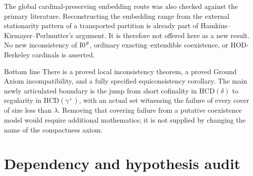 \documentclass[11pt,letterpaper]{article}
\theoremstyle{definition}
\newcommand{\Izero}{\mathrm{I0}}
\newcommand{\HCD}{\mathrm{HCD}}
\begin{document}
The global cardinal-preserving embedding route was also checked against the
primary literature. Reconstructing the embedding range from the external
stationarity pattern of a transported partition is already part of
Hamkins--Kirmayer--Perlmutter's argument. \cite[proofs of Theorems 11--12]{hkp}
It is therefore not offered here as a new result. No new inconsistency of
$\Izero^{\#}$, ordinary exacting--extendible coexistence, or HOD-Berkeley
cardinals is asserted.

\begin{assessment}{Bottom line}
There is a proved local inconsistency theorem, a proved Ground Axiom
incompatibility, and a fully specified equiconsistency corollary. The main
newly articulated boundary is the jump from short cofinality in
$\HCD(\delta)$ to regularity in $\HCD(\gamma^+)$, with an actual set witnessing
the failure of every cover of size less than $\lambda$. Removing that
covering failure from a putative coexistence model would require additional
mathematics; it is not supplied by changing the name of the compactness axiom.
\end{assessment}

\clearpage
\appendix
\section{Dependency and hypothesis audit}\label{app:audit}
\end{document}
